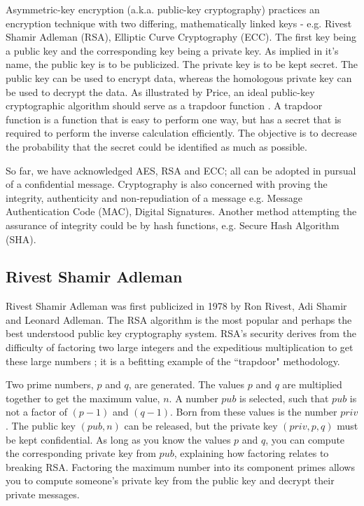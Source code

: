 Asymmetric-key encryption (a.k.a. public-key cryptography) practices an encryption technique with two differing, mathematically linked keys - e.g. Rivest Shamir Adleman (RSA), Elliptic Curve Cryptography (ECC). The first key being a public key and the corresponding key being a private key. As implied in it's name, the public key is to be publicized. The private key is to be kept secret. The public key can be used to encrypt data, whereas the homologous private key can be used to decrypt the data. As illustrated by Price, an ideal public-key cryptographic algorithm should serve as a trapdoor function \cite{Understanding_Cryptog}. A trapdoor function is a function that is easy to perform one way, but has a secret that is required to perform the inverse calculation efficiently. The objective is to decrease the probability that the secret could be identified as much as possible.

So far, we have acknowledged AES, RSA and ECC; all can be adopted in pursual of a confidential message. Cryptography is also concerned with proving the integrity, authenticity and non-repudiation of a message e.g. Message Authentication Code (MAC), Digital Signatures. Another method attempting the assurance of integrity could be by hash functions, e.g. Secure Hash Algorithm (SHA).

\subsection{Rivest Shamir Adleman}
 Rivest Shamir Adleman was first publicized in 1978 by Ron Rivest, Adi Shamir and Leonard Adleman. The RSA algorithm is the most popular and  perhaps the best understood public key cryptography system. RSA's security derives from the difficulty of factoring two large integers and the expeditious multiplication to get these large numbers \cite{Easy_ECC}; it is a befitting example of the ``trapdoor" methodology. 
 
 Two prime numbers, \(p\) and \(q\), are generated. The values \(p\) and \(q\) are multiplied together to get the maximum value, \(n\). 
 A number \(pub\) is selected, such that \(pub\) is not a factor of \((p - 1)\) and \((q - 1)\). %
 Born from these values is the number \(priv\).
 The public key \((pub,n)\) can be released, but the private key \((priv,p,q)\) must be kept confidential.
 As long as you know the values \(p\) and \(q\), you can compute the corresponding private key from \(pub\), explaining how factoring relates to breaking RSA. Factoring the maximum number into its component primes allows you to compute someone's private key from the public key and decrypt their private messages.

